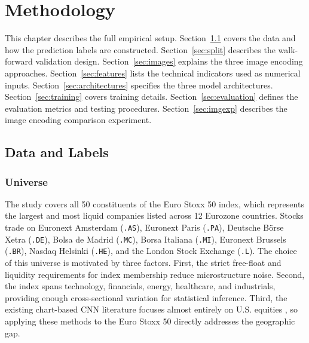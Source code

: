 
\newpage
\section{Methodology}

This chapter describes the full empirical setup. Section~\ref{sec:data} covers the data and how the prediction labels are constructed. Section~\ref{sec:split} describes the walk-forward validation design. Section~\ref{sec:images} explains the three image encoding approaches. Section~\ref{sec:features} lists the technical indicators used as numerical inputs. Section~\ref{sec:architectures} specifies the three model architectures. Section~\ref{sec:training} covers training details. Section~\ref{sec:evaluation} defines the evaluation metrics and testing procedures. Section~\ref{sec:imgexp} describes the image encoding comparison experiment.

\subsection{Data and Labels}
\label{sec:data}

\subsubsection{Universe}

The study covers all 50 constituents of the Euro Stoxx 50 index, which represents the largest and most liquid companies listed across 12 Eurozone countries. Stocks trade on Euronext Amsterdam (\texttt{.AS}), Euronext Paris (\texttt{.PA}), Deutsche Börse Xetra (\texttt{.DE}), Bolsa de Madrid (\texttt{.MC}), Borsa Italiana (\texttt{.MI}), Euronext Brussels (\texttt{.BR}), Nasdaq Helsinki (\texttt{.HE}), and the London Stock Exchange (\texttt{.L}). The choice of this universe is motivated by three factors. First, the strict free-float and liquidity requirements for index membership reduce microstructure noise. Second, the index spans technology, financials, energy, healthcare, and industrials, providing enough cross-sectional variation for statistical inference. Third, the existing chart-based CNN literature focuses almost entirely on U.S. equities \parencite{Jiang2023}, so applying these methods to the Euro Stoxx 50 directly addresses the geographic gap.

